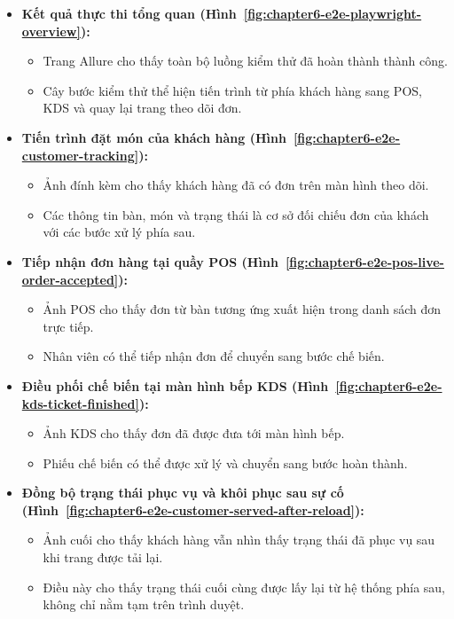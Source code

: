 \begin{itemize}
  \item \textbf{Kết quả thực thi tổng quan (Hình~\ref{fig:chapter6-e2e-playwright-overview}):} 
    \begin{itemize}
      \item Trang Allure cho thấy toàn bộ luồng kiểm thử đã hoàn thành thành công.
      \item Cây bước kiểm thử thể hiện tiến trình từ phía khách hàng sang POS, KDS và quay lại trang theo dõi đơn.
    \end{itemize}

  \item \textbf{Tiến trình đặt món của khách hàng (Hình~\ref{fig:chapter6-e2e-customer-tracking}):}
    \begin{itemize}
      \item Ảnh đính kèm cho thấy khách hàng đã có đơn trên màn hình theo dõi.
      \item Các thông tin bàn, món và trạng thái là cơ sở đối chiếu đơn của khách với các bước xử lý phía sau.
    \end{itemize}

  \item \textbf{Tiếp nhận đơn hàng tại quầy POS (Hình~\ref{fig:chapter6-e2e-pos-live-order-accepted}):}
    \begin{itemize}
      \item Ảnh POS cho thấy đơn từ bàn tương ứng xuất hiện trong danh sách đơn trực tiếp.
      \item Nhân viên có thể tiếp nhận đơn để chuyển sang bước chế biến.
    \end{itemize}

  \item \textbf{Điều phối chế biến tại màn hình bếp KDS (Hình~\ref{fig:chapter6-e2e-kds-ticket-finished}):}
    \begin{itemize}
      \item Ảnh KDS cho thấy đơn đã được đưa tới màn hình bếp.
      \item Phiếu chế biến có thể được xử lý và chuyển sang bước hoàn thành.
    \end{itemize}

  \item \textbf{Đồng bộ trạng thái phục vụ và khôi phục sau sự cố (Hình~\ref{fig:chapter6-e2e-customer-served-after-reload}):}
    \begin{itemize}
      \item Ảnh cuối cho thấy khách hàng vẫn nhìn thấy trạng thái đã phục vụ sau khi trang được tải lại.
      \item Điều này cho thấy trạng thái cuối cùng được lấy lại từ hệ thống phía sau, không chỉ nằm tạm trên trình duyệt.
    \end{itemize}
\end{itemize}

